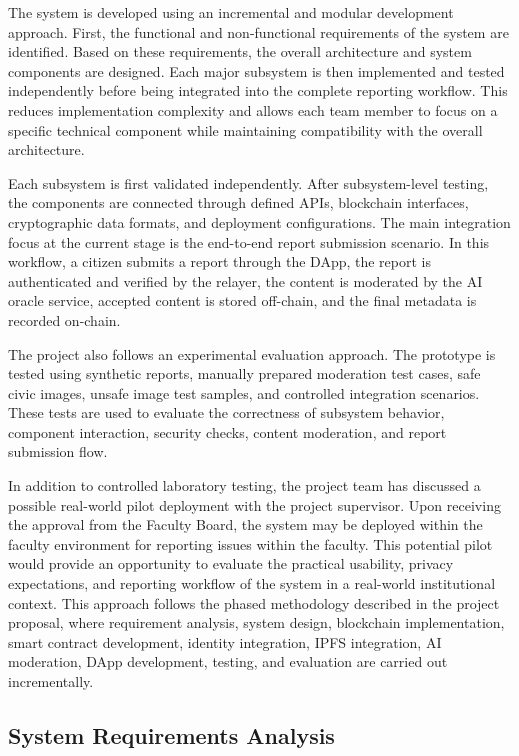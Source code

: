 The system is developed using an incremental and modular development approach. 
First, the functional and non-functional requirements of the system are identified. 
Based on these requirements, the overall architecture and system components are 
designed. Each major subsystem is then implemented and tested independently before 
being integrated into the complete reporting workflow. This reduces implementation 
complexity and allows each team member to focus on a specific technical component 
while maintaining compatibility with the overall architecture.

Each subsystem is first validated independently. After subsystem-level testing, the 
components are connected through defined APIs, blockchain interfaces, cryptographic 
data formats, and deployment configurations. The main integration focus at the current 
stage is the end-to-end report submission scenario. In this workflow, a citizen submits 
a report through the DApp, the report is authenticated and verified by the relayer, the 
content is moderated by the AI oracle service, accepted content is stored off-chain, and 
the final metadata is recorded on-chain.

The project also follows an experimental evaluation approach. The prototype is tested 
using synthetic reports, manually prepared moderation test cases, safe civic images, 
unsafe image test samples, and controlled integration scenarios. These tests are used 
to evaluate the correctness of subsystem behavior, component interaction, security 
checks, content moderation, and report submission flow.

In addition to controlled laboratory testing, the project team has discussed a possible 
real-world pilot deployment with the project supervisor. Upon receiving the approval from the 
Faculty Board, the system may be deployed within the faculty 
environment for reporting issues within the faculty. This potential pilot would provide an opportunity to evaluate the 
practical usability, privacy expectations, and reporting workflow of the system in a 
real-world institutional context.
This approach follows the phased methodology described in the project proposal, where 
requirement analysis, system design, blockchain implementation, smart contract 
development, identity integration, IPFS integration, AI moderation, DApp development, 
testing, and evaluation are carried out incrementally.

\subsection{System Requirements Analysis}

